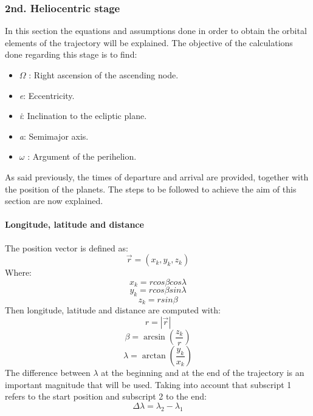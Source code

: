 \subsubsection{2nd. Heliocentric stage }
In this section the equations and assumptions done in order to obtain the orbital elements of the trajectory will be explained. The objective of the calculations done regarding this stage is to find:
\begin{itemize}
\item $\Omega$ : Right ascension of the ascending node.
\item \textit{e}: Eccentricity.
\item \textit{i}: Inclination to the ecliptic plane.
\item \textit{a}: Semimajor axis.
\item $\omega$ : Argument of the perihelion. 
\end{itemize} 
As said previously, the times of departure and arrival are provided, together with the position of the planets. The steps to be followed to achieve the aim of this section are now explained.
\paragraph{Longitude, latitude and distance}
The position vector is defined as: 
\begin{equation}
\overrightarrow{r}=\left( x_k, y_k, z_k \right)
\end{equation}
Where: 
\begin{equation}
x_k = r cos\beta cos\lambda
\end{equation}
\begin{equation}
y_k=r cos\beta sin\lambda
\end{equation}
\begin{equation}
z_k=r sin\beta
\end{equation}
Then longitude, latitude and distance are computed with: 
\begin{equation}
r=|\overrightarrow{r}|
\end{equation}
\begin{equation}
\beta = \arcsin\left(\frac{z_k}{r}\right)
\end{equation}
\begin{equation}
\lambda = \arctan\left(\frac{y_k}{x_k}\right)
\end{equation}
The difference between $\lambda$ at the beginning and at the end of the trajectory is an important magnitude that will be used. Taking into account that subscript 1 refers to the start position and subscript 2 to the end: 
\begin{equation}
\Delta \lambda = \lambda _2 - \lambda _1
\end{equation}
